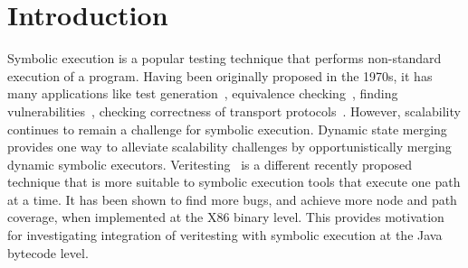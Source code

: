 \section{Introduction}
Symbolic execution is a popular testing technique that performs non-standard execution of a program.
%
Having been originally proposed in the 1970s, it has many applications
like test generation~\cite{dart,cute}, equivalence checking~\cite{ramos,adaptorsynth}, finding vulnerabilities~\cite{driller,angr}, checking correctness of transport protocols~\cite{transport}.
%
However, scalability continues to remain a challenge for symbolic execution.
%
Dynamic state merging~\cite{kuznetsov} provides one way to
alleviate scalability challenges by opportunistically merging dynamic
symbolic executors.
%
Veritesting~\cite{veritesting} is a different recently proposed
technique that is more suitable to symbolic execution tools that execute
one path at a time.
%
It has been shown to find more bugs, and achieve more node and path coverage, when implemented at the X86 binary level.
%
This provides motivation for investigating integration of veritesting with symbolic execution at the Java bytecode level.



